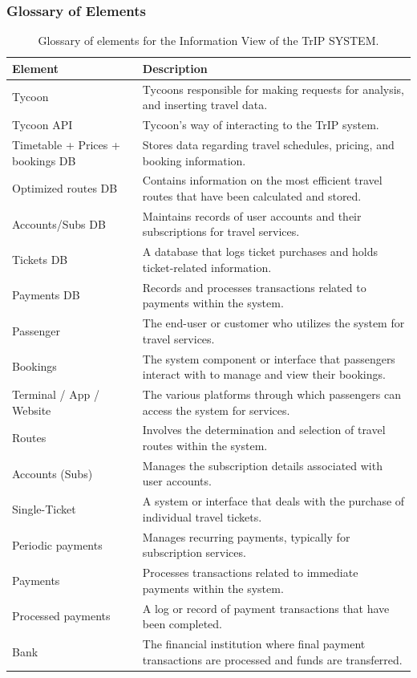 \subsubsection{Glossary of Elements}

\begin{table}[H]
    \centering
    \caption{Glossary of elements for the Information View of the TrIP SYSTEM.}
    \label{tab:information_view_glossary}
    \begin{tabularx}{\textwidth}{@{}lX@{}} %
    \toprule
    \textbf{Element} & \textbf{Description} \\
    \midrule
    Tycoon & Tycoons responsible for making requests for analysis, and inserting travel data. \\
    Tycoon API & Tycoon's way of interacting to the TrIP system. \\
    Timetable + Prices + bookings DB & Stores data regarding travel schedules, pricing, and booking information. \\
    Optimized routes DB & Contains information on the most efficient travel routes that have been calculated and stored. \\
    Accounts/Subs DB & Maintains records of user accounts and their subscriptions for travel services. \\
    Tickets DB & A database that logs ticket purchases and holds ticket-related information. \\
    Payments DB & Records and processes transactions related to payments within the system. \\
    Passenger & The end-user or customer who utilizes the system for travel services. \\
    Bookings & The system component or interface that passengers interact with to manage and view their bookings. \\
    Terminal / App / Website & The various platforms through which passengers can access the system for services. \\
    Routes & Involves the determination and selection of travel routes within the system. \\
    Accounts (Subs) & Manages the subscription details associated with user accounts. \\
    Single-Ticket & A system or interface that deals with the purchase of individual travel tickets. \\
    Periodic payments & Manages recurring payments, typically for subscription services. \\
    Payments & Processes transactions related to immediate payments within the system. \\
    Processed payments & A log or record of payment transactions that have been completed. \\
    Bank & The financial institution where final payment transactions are processed and funds are transferred. \\
    \bottomrule
    \end{tabularx}
\end{table}

